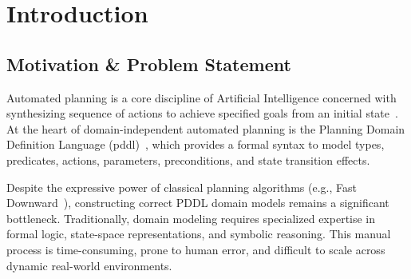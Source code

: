 \chapter{Introduction}
\label{chap:introduction}

\section{Motivation \& Problem Statement}
Automated planning is a core discipline of Artificial Intelligence concerned with synthesizing sequence of actions to achieve specified goals from an initial state~\cite{ghallab2004}. At the heart of domain-independent automated planning is the Planning Domain Definition Language (\gls{pddl})~\cite{mcdermott1998}, which provides a formal syntax to model types, predicates, actions, parameters, preconditions, and state transition effects.

Despite the expressive power of classical planning algorithms (e.g., Fast Downward~\cite{helmert2006}), constructing correct PDDL domain models remains a significant bottleneck. Traditionally, domain modeling requires specialized expertise in formal logic, state-space representations, and symbolic reasoning. This manual process is time-consuming, prone to human error, and difficult to scale across dynamic real-world environments.

